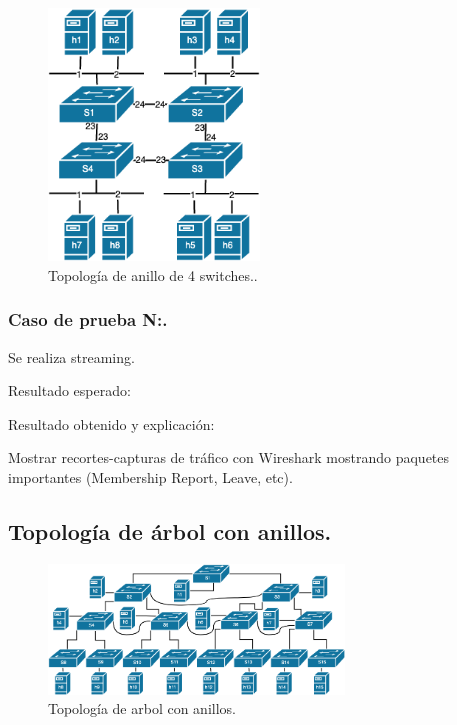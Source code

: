 \documentclass[12pt,a4paper,oneside]{book}
\begin{document}
\begin{figure}[ht]
 \centering
 \includegraphics[width=0.5\textwidth]{fotos/5_Pruebas/3_topo_anillo/simple.png}
 \caption{Topología de anillo de 4 switches..}
 \label{anillo_simple}
\end{figure}

\subsubsection{Caso de prueba N:.} 
Se realiza streaming.

\vspace{0.5cm}
Resultado esperado: 

\vspace{0.5cm}
Resultado obtenido y explicación: 

\vspace{0.5cm}
Mostrar recortes-capturas de tráfico con Wireshark mostrando paquetes importantes (Membership Report, Leave, etc).

\subsection{Topología de árbol con anillos.}

\begin{figure}[ht]
 \centering
 \includegraphics[width=0.7\textwidth]{fotos/5_Pruebas/3_topo_anillo/arbol_anillo.png}
 \caption{Topología de arbol con anillos.}
 \label{arbol_anillos}
\end{figure}
\end{document}

